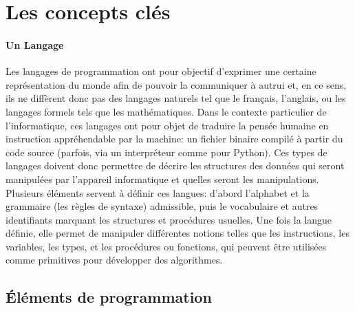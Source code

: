 \section{Les concepts clés}\label{sec:concept}
    \paragraph{Un Langage}
        Les langages de programmation ont pour objectif  d'exprimer une certaine représentation du monde afin de pouvoir la communiquer à autrui et, en ce sens, ils ne diffèrent donc pas des langages naturels tel que le français, l'anglais, \etc ou les langages formels tels que les mathématiques.
        Dans le contexte particulier de l'informatique, ces langages ont pour objet de traduire la pensée humaine en instruction appréhendable par la machine: un fichier binaire compilé à partir du code source (parfois, via un interpréteur comme pour Python). 
        Ces types de langages doivent donc permettre de décrire les structures des données qui seront manipulées par l'appareil informatique et quelles seront les manipulations. 
        Plusieurs éléments servent à définir ces langues: d'abord l'alphabet et la grammaire (\ie les règles de syntaxe) admissible, puis le vocabulaire et autres identifiants marquant les structures et procédures usuelles.
        Une fois la langue définie, elle permet de manipuler différentes notions telles que les instructions, les variables, les types, et les procédures ou fonctions, qui peuvent être utilisées comme primitives pour développer des algorithmes.
    \subsection{Éléments de programmation}
